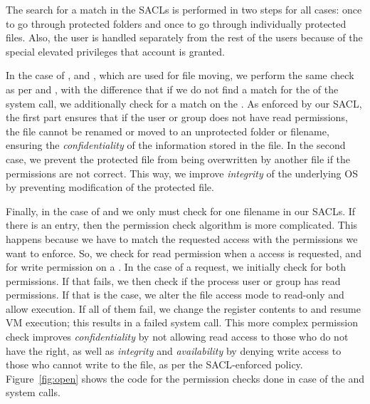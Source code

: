 \par The search for a match in the \ac{SACL}s is performed in two steps for all cases: once to go through protected folders and once to go through individually protected files. Also, the  user is handled separately from the rest of the users because of the special elevated privileges that account is granted. 

\par In the case of ,  and , which are used for file moving, we perform the same check as per  and , with the difference that if we do not find a match for the  of the system call, we additionally check for a match on the . As enforced by our \ac{SACL}, the first part ensures that if the user or group does not have read permissions, the file cannot be renamed or moved to an unprotected folder or filename, ensuring the \emph{confidentiality} of the information stored in the file. In the second case, we prevent the protected file from being overwritten by another file if the permissions are not correct. This way, we improve \emph{integrity} of the underlying \ac{OS} by preventing modification of the protected file. 

\par Finally, in the case of  and  we only must check for one filename in our \ac{SACL}s. If there is an entry, then the permission check algorithm is more complicated. This happens because we have to match the requested access  with the permissions we want to enforce. So, we check for read permission when a  access is requested, and for write permission on a . In the case of a  request, we initially check for both permissions. If that fails, we then check if the process user or group has read permissions. If that is the case, we alter the file access mode to read-only and allow execution. If all of them fail, we change the  register contents to  and resume \ac{VM} execution; this results in a failed system call. This more complex permission check improves \emph{confidentiality} by not allowing read access to those who do not have the right, as well as \emph{integrity} and \emph{availability} by denying write access to those who cannot write to the file, as per the \ac{SACL}-enforced policy. Figure~\ref{fig:open} shows the code for the permission checks done in case of the  and  system calls.




